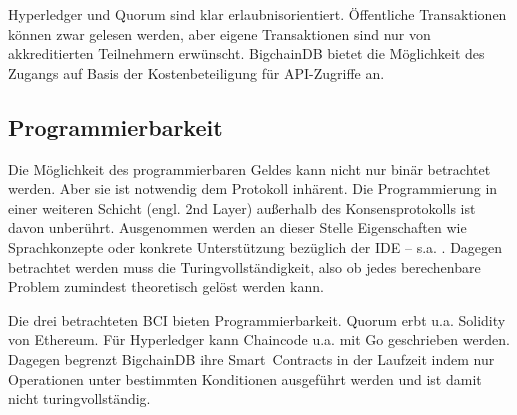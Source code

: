 Hyperledger und Quorum sind klar erlaubnisorientiert.
Öffentliche Transaktionen können zwar gelesen werden, aber eigene Transaktionen sind nur von akkreditierten Teilnehmern erwünscht.
BigchainDB bietet die Möglichkeit des Zugangs auf Basis der Kostenbeteiligung für API-Zugriffe an.

\subsection{Programmierbarkeit}\label{krit:programmierbarkeit}

Die Möglichkeit des programmierbaren Geldes kann nicht nur binär betrachtet werden.
Aber sie ist notwendig dem Protokoll inhärent.
Die Programmierung in einer weiteren Schicht (engl. 2nd Layer) außerhalb des Konsensprotokolls ist davon unberührt.
Ausgenommen werden an dieser Stelle Eigenschaften wie Sprachkonzepte oder konkrete Unterstützung bezüglich der \gls{IDE} -- s.a. .
Dagegen betrachtet werden muss die Turingvollständigkeit, also ob jedes berechenbare Problem zumindest theoretisch gelöst werden kann.  

Die drei betrachteten \gls{BCI} bieten Programmierbarkeit.
Quorum erbt u.a. Solidity von Ethereum.
Für Hyperledger kann Chaincode u.a. mit Go geschrieben werden.
Dagegen begrenzt BigchainDB ihre Smart~Contracts in der Laufzeit indem nur Operationen unter bestimmten Konditionen ausgeführt werden und ist damit nicht turingvollständig. 






